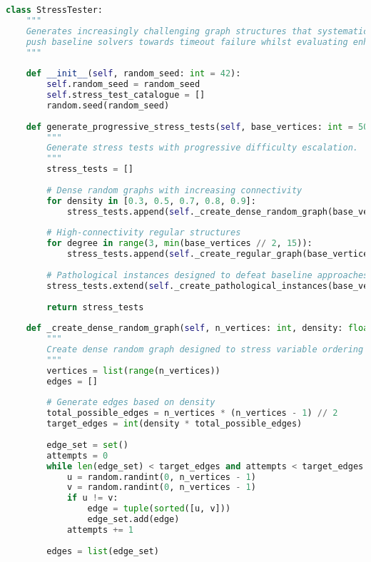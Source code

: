 \begin{lstlisting}[language=Python, caption=Stress Testing Framework for Worst-Case Validation]
class StressTester:
    """
    Generates increasingly challenging graph structures that systematically 
    push baseline solvers towards timeout failure whilst evaluating enhanced solver resilience.
    """
    
    def __init__(self, random_seed: int = 42):
        self.random_seed = random_seed
        self.stress_test_catalogue = []
        random.seed(random_seed)
        
    def generate_progressive_stress_tests(self, base_vertices: int = 50) -> List[Dict]:
        """
        Generate stress tests with progressive difficulty escalation.
        """
        stress_tests = []
        
        # Dense random graphs with increasing connectivity
        for density in [0.3, 0.5, 0.7, 0.8, 0.9]:
            stress_tests.append(self._create_dense_random_graph(base_vertices, density))
        
        # High-connectivity regular structures
        for degree in range(3, min(base_vertices // 2, 15)):
            stress_tests.append(self._create_regular_graph(base_vertices, degree))
        
        # Pathological instances designed to defeat baseline approaches
        stress_tests.extend(self._create_pathological_instances(base_vertices))
        
        return stress_tests
    
    def _create_dense_random_graph(self, n_vertices: int, density: float) -> Dict:
        """
        Create dense random graph designed to stress variable ordering heuristics.
        """
        vertices = list(range(n_vertices))
        edges = []
        
        # Generate edges based on density
        total_possible_edges = n_vertices * (n_vertices - 1) // 2
        target_edges = int(density * total_possible_edges)
        
        edge_set = set()
        attempts = 0
        while len(edge_set) < target_edges and attempts < target_edges * 10:
            u = random.randint(0, n_vertices - 1)
            v = random.randint(0, n_vertices - 1)
            if u != v:
                edge = tuple(sorted([u, v]))
                edge_set.add(edge)
            attempts += 1
        
        edges = list(edge_set)
        

\end{lstlisting}
